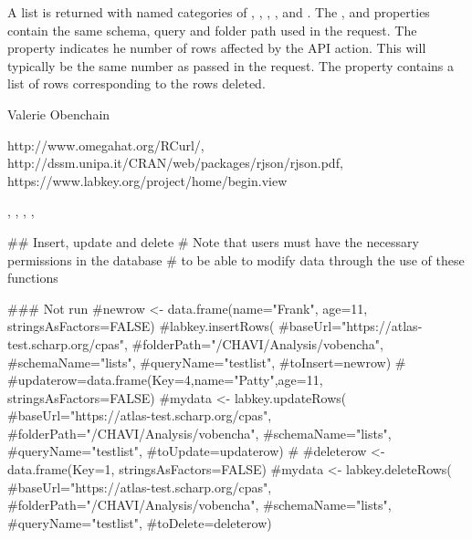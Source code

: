 \documentclass{book}
\begin{document}
\begin{Value}
A list is returned with named categories of , , , ,  and .
The ,  and  properties contain the same schema, query 
and folder path used in the request.  The
 property indicates he number of rows affected by the API action. This will typically be the same
number as passed in the request. The  property contains a list of rows corresponding to the rows
deleted.
\end{Value}
\begin{Author}\relax
Valerie Obenchain
\end{Author}
\begin{References}\relax
http://www.omegahat.org/RCurl/, \\
http://dssm.unipa.it/CRAN/web/packages/rjson/rjson.pdf,\\
https://www.labkey.org/project/home/begin.view
\end{References}
\begin{SeeAlso}\relax
{}, , , 
, \\
\end{SeeAlso}
\begin{Examples}
\begin{ExampleCode}
## Insert, update and delete
# Note that users must have the necessary permissions in the database
# to be able to modify data through the use of these functions

### Not run
#newrow <- data.frame(name="Frank", age=11, stringsAsFactors=FALSE)
#labkey.insertRows(
#baseUrl="https://atlas-test.scharp.org/cpas", 
#folderPath="/CHAVI/Analysis/vobencha", 
#schemaName="lists", 
#queryName="testlist", 
#toInsert=newrow)
#
#updaterow=data.frame(Key=4,name="Patty",age=11, stringsAsFactors=FALSE)
#mydata <- labkey.updateRows(
#baseUrl="https://atlas-test.scharp.org/cpas", 
#folderPath="/CHAVI/Analysis/vobencha", 
#schemaName="lists", 
#queryName="testlist", 
#toUpdate=updaterow)
#
#deleterow <- data.frame(Key=1, stringsAsFactors=FALSE)
#mydata <- labkey.deleteRows(
#baseUrl="https://atlas-test.scharp.org/cpas", 
#folderPath="/CHAVI/Analysis/vobencha", 
#schemaName="lists", 
#queryName="testlist", 
#toDelete=deleterow)

\end{ExampleCode}
\end{Examples}
\end{document}
